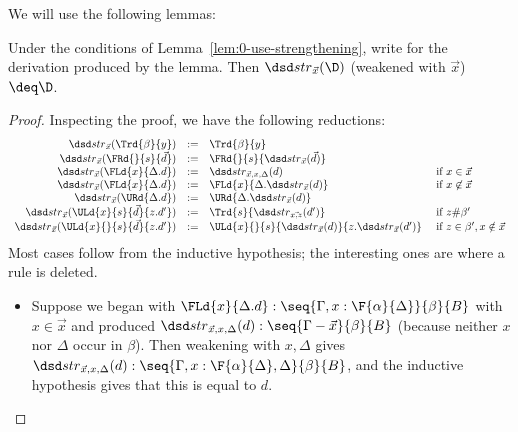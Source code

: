 We will use the following lemmas:

\begin{lemma} \label{lem:0-use-strengthening-eq}
Under the conditions of Lemma~\ref{lem:0-use-strengthening}, write
 for the derivation produced by the lemma.  Then
$\str{\vec{x}}{\D}$ (weakened with $\vec{x}$) $\deq \D$.  
\end{lemma}
\begin{proof}
Inspecting the proof, we have the following reductions:
\[
\begin{array}{rcll}
\str{\vec{x}}{\Trd{\beta}{y}} & := & {\Trd{\beta}{y}}\\
\str{\vec{x}}{\FRd{}{s}{\vec{d}}} & := & \FRd{}{s}{\str{\vec{x}}{\vec{d}}}\\
\str{\vec{x}}{\FLd{x}{\Delta.d}} & := & \str{\vec{x},x,\Delta}{d} & \text{ if } x \in \vec{x}\\
\str{\vec{x}}{\FLd{x}{\Delta.d}} & := & \FLd{x}{\Delta.\str{\vec{x}}{d}} & \text{ if } x \not\in \vec{x}\\
\str{\vec{x}}{\URd{\Delta.d}} & := & \URd{\Delta.\str{\vec{x}}{d}}\\
\str{\vec{x}}{\ULd{x}{s}{\vec{d}}{z.d'}} & := & \Trd{s}{\str{\vec{x,z}}{d'}} & \text{ if } z \# \beta'\\
\str{\vec{x}}{\ULd{x}{}{s}{\vec{d}}{z.d'}} & := & \ULd{x}{}{s}{\str{\vec{x}}{d}}{z.\str{\vec{x}}{d'}} & \text{ if } z \in \beta', x \notin \vec{x}\\
\end{array}
\]
Most cases follow from the inductive hypothesis; the interesting ones
are where a rule is deleted.  

\begin{itemize}

\item Suppose we began with $\FLd{x}{\Delta.d} :
  \seq{\Gamma,x:\F{\alpha}{\Delta}}{\beta}{B}$ with $x \in \vec{x}$ and
  produced $\str{\vec{x},x,\Delta}{d} : \seq{\Gamma-\vec{x}}{\beta}{B}$
  (because neither $x$ nor $\Delta$ occur in $\beta$).  Then weakening
  with $x,\Delta$ gives $\str{\vec{x},x,\Delta}{d} :
  \seq{\Gamma,x:\F{\alpha}{\Delta},\Delta}{\beta}{B}$, and the inductive
  hypothesis gives that this is equal to $d$.  


\end{itemize}
\end{proof}
